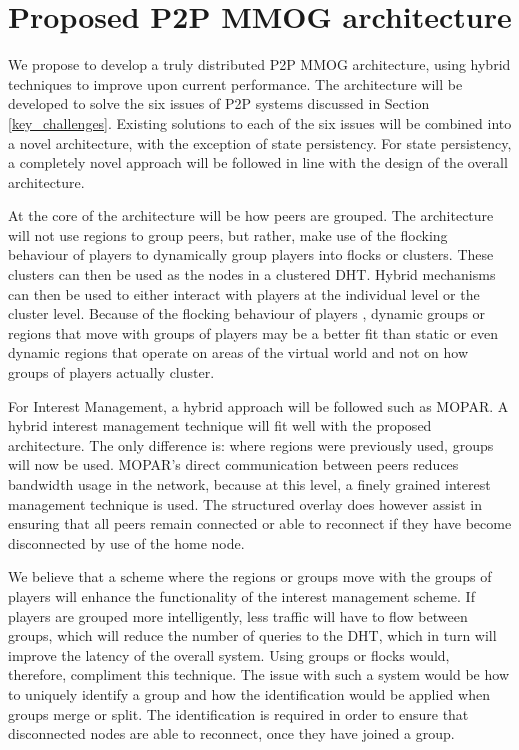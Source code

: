 \documentclass[journal,oneside,a4paper,onecolumn]{IEEEtran}
\begin{document}
\section{Proposed P2P MMOG architecture}
\label{proposed_architecture}

We propose to develop a truly distributed P2P MMOG architecture, using hybrid techniques to improve upon current performance. The architecture will be developed to solve the six issues of P2P systems discussed in Section \ref{key_challenges}. Existing solutions to each of the six issues will be combined into a novel architecture, with the exception of state persistency. For state persistency, a completely novel approach will be followed in line with the design of the overall architecture.

At the core of the architecture will be how peers are grouped. The architecture will not use regions to group peers, but rather, make use of the flocking behaviour of players to dynamically group players into flocks or clusters. These clusters can then be used as the nodes in a clustered \ac{DHT}. Hybrid mechanisms can then be used to either interact with players at the individual level or the cluster level. Because of the flocking behaviour of players \cite{flocking}, dynamic groups or regions that move with groups of players may be a better fit than static or even dynamic regions that operate on areas of the virtual world and not on how groups of players actually cluster.

For Interest Management, a hybrid approach will be followed such as MOPAR. A hybrid interest management technique will fit well with the proposed architecture. The only difference is: where regions were previously used, groups will now be used. MOPAR's direct communication between peers reduces bandwidth usage in the network, because at this level, a finely grained interest management technique is used. The structured overlay does however assist in ensuring that all peers remain connected or able to reconnect if they have become disconnected by use of the home node.

We believe that a scheme where the regions or groups move with the groups of players will enhance the functionality of the interest management scheme. If players are grouped more intelligently, less traffic will have to flow between groups, which will reduce the number of queries to the DHT, which in turn will improve the latency of the overall system. Using groups or flocks would, therefore, compliment this technique. The issue with such a system would be how to uniquely identify a group and how the identification would be applied when groups merge or split. The identification is required in order to ensure that disconnected nodes are able to reconnect, once they have joined a group.
\end{document}

